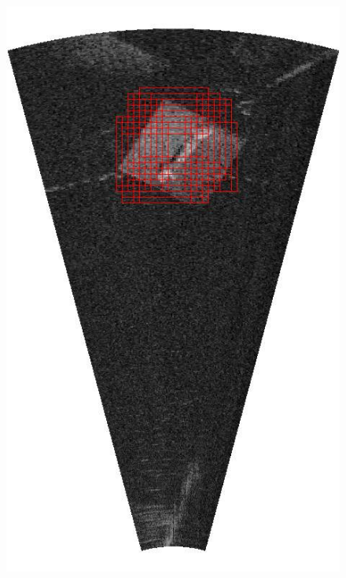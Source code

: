 \begin{figure}[!t]
{        \includegraphics[height=0.2\textheight]{chapters/images/proposals/unseen/detections-rotating-platform-wrench.jpg}
}
\end{figure}
